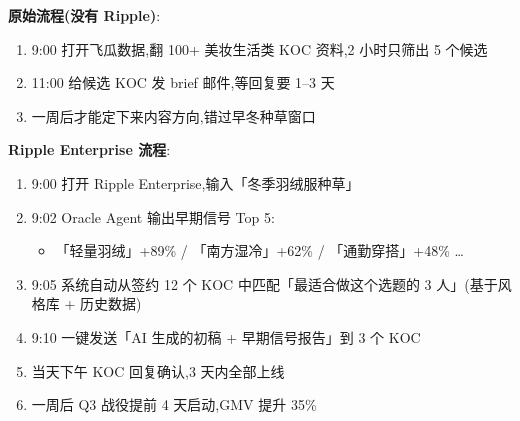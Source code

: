 \textbf{原始流程(没有 Ripple)}:
\begin{enumerate}
\item 9:00 打开飞瓜数据,翻 100+ 美妆生活类 KOC 资料,2 小时只筛出 5 个候选
\item 11:00 给候选 KOC 发 brief 邮件,等回复要 1--3 天
\item 一周后才能定下来内容方向,错过早冬种草窗口
\end{enumerate}

\textbf{Ripple Enterprise 流程}:
\begin{enumerate}
\item 9:00 打开 Ripple Enterprise,输入「冬季羽绒服种草」
\item 9:02 Oracle Agent 输出早期信号 Top 5:
    \begin{itemize}
    \item 「轻量羽绒」+89\% / 「南方湿冷」+62\% / 「通勤穿搭」+48\% \dots
    \end{itemize}
\item 9:05 系统自动从签约 12 个 KOC 中匹配「最适合做这个选题的 3 人」(基于风格库 + 历史数据)
\item 9:10 一键发送「AI 生成的初稿 + 早期信号报告」到 3 个 KOC
\item 当天下午 KOC 回复确认,3 天内全部上线
\item 一周后 Q3 战役提前 4 天启动,GMV 提升 35\%
\end{enumerate}
